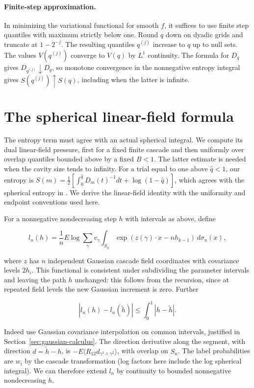 \documentclass[11pt]{article}
\begin{document}
\paragraph{Finite-step approximation.}
In minimizing the variational functional for smooth $f$, it suffices to use finite step quantiles with maximum strictly below one. Round $q$ down on dyadic grids and truncate at $1-2^{-j}$. The resulting quantiles $q^{(j)}$ increase to $q$ up to null sets. The values $V(q^{(j)})$ converge to $V(q)$ by $L^1$ continuity. The formula for $D_q$ gives $D_{q^{(j)}}\downarrow D_q$, so monotone convergence in the nonnegative entropy integral gives $S(q^{(j)})\uparrow S(q)$, including when the latter is infinite.

\section{The spherical linear-field formula}\label{sec:spherical}

The entropy term must agree with an actual spherical integral. We compute its
dual linear-field pressure, first for a fixed finite cascade and then uniformly
over overlap quantiles bounded above by a fixed $B<1$. The latter estimate is
needed when the cavity size tends to infinity.
For a trial equal to one above $\widehat q<1$, our entropy is
$S(m)=\tfrac12[\int_0^{\widehat q}D_m(t)^{-1}dt+\log(1-\widehat q)]$,
which agrees with the spherical entropy in
\cite[Equation~(1.11)]{Talagrand2006Spherical}. We derive the linear-field
identity with the uniformity and endpoint conventions used here.

For a nonnegative nondecreasing step $h$ with intervals as above, define

\begin{equation*}
l_n(h)=\frac1n E\log\sum_\gamma v_\gamma\int_{S_n}
          \exp(z(\gamma)\cdot x-n h_{k-1})\,d\sigma_n(x),
\end{equation*}

where $z$ has $n$ independent Gaussian cascade field coordinates with covariance levels $2h_i$. This functional is consistent under subdividing the parameter intervals and leaving the path $h$ unchanged: this follows from the recursion, since at repeated field levels the new Gaussian increment is zero. Further

\begin{equation*}
|l_n(h)-l_n(\tilde h)|\le\int_0^1|h-\tilde h|.
\end{equation*}

Indeed use Gaussian covariance interpolation on common intervals, justified in Section~\ref{sec:gaussian-calculus}. The direction derivative along the segment, with direction $d=\tilde h-h$, is $-E\langle R_{12} d_{\gamma^1\wedge\gamma^2}\rangle$, with overlap on $S_n$. The label probabilities are $w_i$ by the cascade transformation (log factors here include the log spherical integral). We can therefore extend $l_n$ by continuity to bounded nonnegative nondecreasing $h$.
\end{document}
